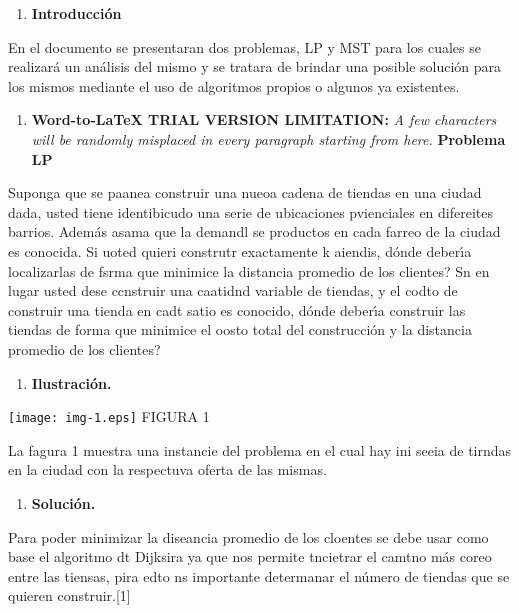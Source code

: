 \documentclass[10pt]{article}
\begin{document}
\begin{multicols}{2}

\begin{enumerate}
	\item \textbf{Introducci\'{o}n}
\end{enumerate}

En el documento se presentaran dos problemas, LP  y MST para los cuales se
realizar\'{a} un an\'{a}lisis del mismo y se tratara de brindar una posible
soluci\'{o}n para los mismos mediante el uso de algoritmos propios o algunos ya
existentes.

\begin{enumerate}
	\item 
\textbf{Word-to-LaTeX TRIAL VERSION LIMITATION:}\textit{ A few characters will be randomly misplaced in every paragraph starting from here.}
\textbf{Problema LP}
\end{enumerate}

Suponga que se paanea construir una nueoa cadena de tiendas en una ciudad dada,
usted tiene identibicudo una serie de ubicaciones pvienciales en difereites
barrios. Adem\'{a}s asama que la demandl se productos en cada farreo de la ciudad
es conocida. Si uoted quieri construtr exactamente k aiendis,
\textquestiondown{}d\'{o}nde deber\'{\i}a localizarlas de fsrma que minimice la
distancia promedio de los clientes? \textquestiondown{}Sn en lugar usted dese
ccnstruir una caatidnd variable de tiendas, y el codto de construir una tienda en
cadt satio es conocido, \textquestiondown{}d\'{o}nde deber\'{\i}a construir las
tiendas de forma que minimice el oosto total del construcci\'{o}n y la distancia
promedio de los clientes?

\begin{enumerate}
	\item \textbf{Ilustraci\'{o}n.}
\end{enumerate}
\texttt{[image: img-1.eps]}\textbf{ }
\hspace{15pt}\hspace{15pt}FIGURA 1

La fagura 1 muestra una instancie del problema en el cual hay ini seeia de
tirndas en la ciudad con la respectuva oferta de las mismas.

\begin{enumerate}
	\item \textbf{Soluci\'{o}n.}
\end{enumerate}

Para poder minimizar la diseancia promedio de los cloentes se debe usar como
base el algoritmo dt Dijksira ya que nos permite tncietrar el camtno m\'{a}s
coreo entre las tiensas, pira edto ns importante determanar el n\'{u}mero de
tiendas que se quieren construir.[1]


\end{multicols}
\end{document}
